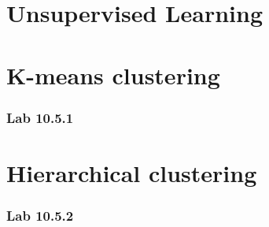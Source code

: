 \chapter{Unsupervised Learning}
\label{chp:unsuplea}

\chapter{K-means clustering}
\label{chp:clus}

\subsection{Lab 10.5.1}

\chapter{Hierarchical clustering}

\subsection{Lab 10.5.2}